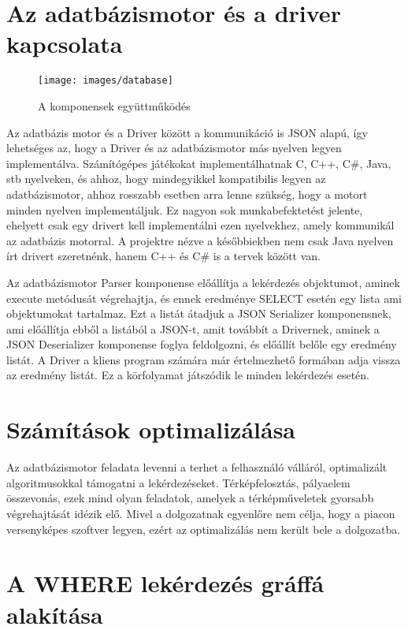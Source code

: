 \section{Az adatbázismotor és a driver kapcsolata}

\begin{figure}[htb]
	\begin{center}
		\texttt{[image: images/database]}
		\caption{A komponensek együttműködés}
		\label{fig:database}
	\end{center}
\end{figure}

Az adatbázis motor és a Driver között a kommunikáció is JSON alapú, így lehetséges az, hogy a Driver és az adatbázismotor más nyelven legyen implementálva. Számítógépes játékokat implementálhatnak C, C++, C\#, Java, stb nyelveken, és ahhoz, hogy mindegyikkel kompatibilis legyen az adatbázismotor, ahhoz rosszabb esetben arra lenne szükség, hogy a motort minden nyelven implementáljuk. Ez nagyon sok munkabefektetést jelente, ehelyett csak egy drivert kell implementálni ezen nyelvekhez, amely kommunikál az adatbázis motorral. A projektre nézve a későbbiekben nem csak Java nyelven írt drivert szeretnénk, hanem C++ és C\# is a tervek között van.

Az adatbázismotor Parser komponense előállítja a lekérdezés objektumot, aminek execute metódusát végrehajtja, és ennek eredménye SELECT esetén egy lista ami objektumokat tartalmaz. Ezt a listát átadjuk a JSON Serializer komponensnek, ami előállítja ebből a listából a JSON-t, amit továbbít a Drivernek, aminek a JSON Deserializer komponense foglya feldolgozni, és előállít belőle egy eredmény listát. A Driver a kliens program számára már értelmezhető formában adja vissza az eredmény listát. Ez a körfolyamat játszódik le minden lekérdezés esetén.

\section{Számítások optimalizálása}

Az adatbázismotor feladata levenni a terhet a felhasználó válláról, 
optimalizált algoritmusokkal támogatni a lekérdezéseket. Térképfelosztás, pályaelem összevonás, ezek mind olyan feladatok,
amelyek a térképműveletek gyorsabb végrehajtását idézik elő.
Mivel a dolgozatnak egyenlőre nem célja, hogy a piacon versenyképes szoftver legyen, ezért az optimalizálás nem került bele a dolgozatba.

\section{A WHERE lekérdezés gráffá alakítása}

